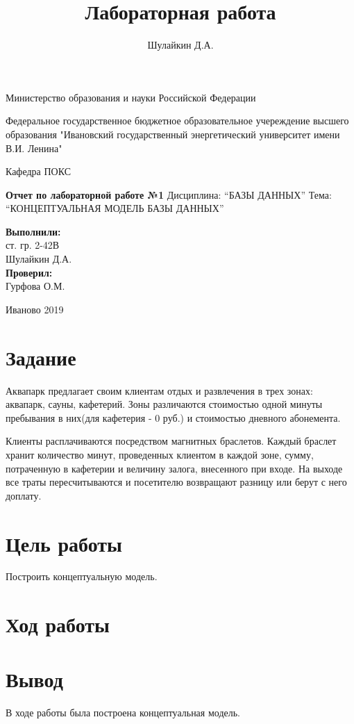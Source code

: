 \documentclass[a4paper]{article}
\title{Лабораторная работа}
\author{Шулайкин Д.А.}
\begin{document}
\onehalfspacing
\thispagestyle{empty}

\begin{center}
Министерство образования и науки Российской Федерации
\vspace{10pt}

Федеральное государственное бюджетное образовательное учереждение высшего образования "Ивановский государственный энергетический университет имени В.И. Ленина"
\vspace{40pt}

Кафедра ПОКС
\vspace{40pt}

\textbf{Отчет по лабораторной работе №1}
Дисциплина: ``БАЗЫ ДАННЫХ''
Тема: ``КОНЦЕПТУАЛЬНАЯ МОДЕЛЬ БАЗЫ ДАННЫХ''
\end{center}

\vspace{330pt}

\begin{flushright}
\textbf{Выполнили:} \\
ст. гр. 2-42В \\
Шулайкин Д.А. \\

\textbf{Проверил:} \\
Гурфова О.М.
\end{flushright}

\vspace{40pt}

\begin{center}
	Иваново 2019
\end{center}

\pagebreak

\section{Задание}
Аквапарк предлагает своим клиентам отдых и развлечения в трех зонах: аквапарк, сауны, кафетерий. Зоны различаются стоимостью одной минуты пребывания в них(для кафетерия - 0 руб.) и стоимостью дневного абонемента.

Клиенты расплачиваются посредством магнитных браслетов. Каждый браслет хранит количество минут, проведенных клиентом в каждой зоне, сумму, потраченную в кафетерии и величину залога, внесенного при входе. На выходе все траты пересчитываются и посетителю возвращают разницу или берут с него доплату.

\section{Цель работы}
Построить концептуальную модель.

\section{Ход работы}

%

\section{Вывод}
В ходе работы была построена концептуальная модель.
\end{document}
